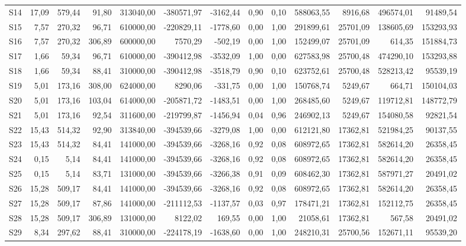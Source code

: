 \begin{longtable}{lrrrrrrrrrrrr}
S14 & 17,09 & 579,44 & 91,80 & 313040,00 & -380571,97 & -3162,44 & 0,90 & 0,10 & 588063,55 & 8916,68 & 496574,01 & 91489,54 \\
S15 & 7,57 & 270,32 & 96,71 & 610000,00 & -220829,11 & -1778,60 & 0,00 & 1,00 & 291899,61 & 25701,09 & 138605,69 & 153293,93 \\
S16 & 7,57 & 270,32 & 306,89 & 600000,00 & 7570,29 & -502,19 & 0,00 & 1,00 & 152499,07 & 25701,09 & 614,35 & 151884,73 \\
S17 & 1,66 & 59,34 & 96,71 & 610000,00 & -390412,98 & -3532,09 & 1,00 & 0,00 & 627583,98 & 25700,48 & 474290,10 & 153293,88 \\
S18 & 1,66 & 59,34 & 88,41 & 310000,00 & -390412,98 & -3518,79 & 0,90 & 0,10 & 623752,61 & 25700,48 & 528213,42 & 95539,19 \\
S19 & 5,01 & 173,16 & 308,00 & 624000,00 & 8290,06 & -331,75 & 0,00 & 1,00 & 150768,74 & 5249,67 & 664,71 & 150104,03 \\
S20 & 5,01 & 173,16 & 103,04 & 614000,00 & -205871,72 & -1483,51 & 0,00 & 1,00 & 268485,60 & 5249,67 & 119712,81 & 148772,79 \\
S21 & 5,01 & 173,16 & 92,54 & 311600,00 & -219799,87 & -1456,94 & 0,04 & 0,96 & 246902,13 & 5249,67 & 154080,58 & 92821,54 \\
S22 & 15,43 & 514,32 & 92,90 & 313840,00 & -394539,66 & -3279,08 & 1,00 & 0,00 & 612121,80 & 17362,81 & 521984,25 & 90137,55 \\
S23 & 15,43 & 514,32 & 84,41 & 141000,00 & -394539,66 & -3268,16 & 0,92 & 0,08 & 608972,65 & 17362,81 & 582614,20 & 26358,45 \\
S24 & 0,15 & 5,14 & 84,41 & 141000,00 & -394539,66 & -3268,16 & 0,92 & 0,08 & 608972,65 & 17362,81 & 582614,20 & 26358,45 \\
S25 & 0,15 & 5,14 & 83,71 & 131000,00 & -394539,66 & -3266,38 & 0,91 & 0,09 & 608462,30 & 17362,81 & 587971,27 & 20491,02 \\
S26 & 15,28 & 509,17 & 84,41 & 141000,00 & -394539,66 & -3268,16 & 0,92 & 0,08 & 608972,65 & 17362,81 & 582614,20 & 26358,45 \\
S27 & 15,28 & 509,17 & 87,86 & 141000,00 & -211112,53 & -1137,57 & 0,03 & 0,97 & 178471,21 & 17362,81 & 152112,75 & 26358,45 \\
S28 & 15,28 & 509,17 & 306,89 & 131000,00 & 8122,02 & 169,55 & 0,00 & 1,00 & 21058,61 & 17362,81 & 567,58 & 20491,02 \\
S29 & 8,34 & 297,62 & 88,41 & 310000,00 & -224178,19 & -1638,60 & 0,00 & 1,00 & 248210,31 & 25700,56 & 152671,11 & 95539,20 \\

\end{longtable}
